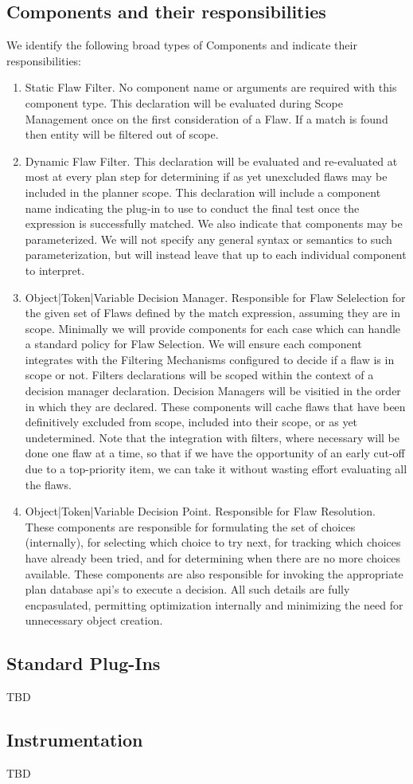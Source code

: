 \documentclass[10pt, letterpaper, twoside]{article}
\begin{document}
\subsection{Components and their responsibilities}
We identify the following broad types of Components and indicate their responsibilities:
\begin{enumerate}
\item Static Flaw Filter. No component name or arguments are required with this component type. This declaration will be evaluated during Scope Management once on the first consideration of a Flaw. If a match is found then entity will be filtered out of scope.
\item Dynamic Flaw Filter. This declaration will be evaluated and re-evaluated at most at every plan step for determining if as yet unexcluded flaws may be included in the planner scope. This declaration will include a component name indicating the plug-in to use to conduct the final test once the expression is successfully matched. We also indicate that components may be parameterized. We will not specify any general syntax or semantics to such parameterization, but will instead leave that up to each individual component to interpret.
\item Object|Token|Variable Decision Manager. Responsible for Flaw Selelection for the given set of Flaws defined by the match expression, assuming they are in scope. Minimally we will provide components for each case which can handle a standard policy for Flaw Selection. We will ensure each component integrates with the Filtering Mechanisms configured to decide if a flaw is in scope or not. Filters declarations will be scoped within the context of a decision manager declaration. Decision Managers will be visitied in the order in which they are declared. These components will cache flaws that have been definitively excluded from scope, included into their scope, or as yet undetermined. Note that the integration with filters, where necessary will be done one flaw at a time, so that if we have the opportunity of an early cut-off due to a top-priority item, we can take it without wasting effort evaluating all the flaws.
\item Object|Token|Variable Decision Point. Responsible for Flaw Resolution. These components are responsible for formulating the set of choices (internally), for selecting which choice to try next, for tracking which choices have already been tried, and for determining when there are no more choices available. These components are also responsible for invoking the appropriate plan database api's to execute a decision. All such details are fully encpasulated, permitting optimization internally and minimizing the need for unnecessary object creation.
\end{enumerate}

\subsection{Standard Plug-Ins}
TBD

\subsection{Instrumentation}
TBD
\end{document}
